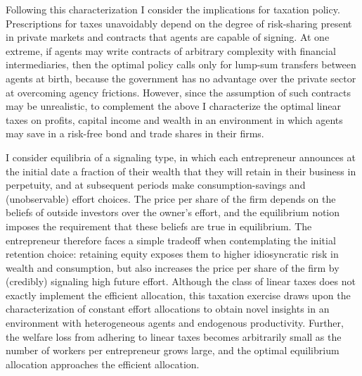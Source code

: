 \documentclass[11pt]{article}
\theoremstyle{plain}
\begin{document}
Following this characterization I consider the implications for taxation policy. Prescriptions for taxes unavoidably depend on the degree of risk-sharing present in private markets and contracts that agents are capable of signing. At one extreme, if agents may write contracts of arbitrary complexity with financial intermediaries, then the optimal policy calls only for lump-sum transfers between agents at birth, because the government has no advantage over the private sector at overcoming agency frictions. However, since the assumption of such contracts may be unrealistic, to complement the above I characterize the optimal linear taxes on profits, capital income and wealth in an environment in which agents may save in a risk-free bond and trade shares in their firms. 


I consider equilibria of a signaling type, in which each entrepreneur announces at the initial date a fraction of their wealth that they will retain in their business in perpetuity, and at subsequent periods make consumption-savings and (unobservable) effort choices. The price per share of the firm depends on the beliefs of outside investors over the owner's effort, and the equilibrium notion imposes the requirement that these beliefs are true in equilibrium. The entrepreneur therefore faces a simple tradeoff when contemplating the initial retention choice: retaining equity exposes them to higher idiosyncratic risk in wealth and consumption, but also increases the price per share of the firm by (credibly) signaling high future effort. Although the class of linear taxes does not exactly implement the efficient allocation, this taxation exercise draws upon the characterization of constant effort allocations to obtain novel insights in an environment with heterogeneous agents and endogenous productivity. Further, the welfare loss from adhering to linear taxes becomes arbitrarily small as the number of workers per entrepreneur grows large, and the optimal equilibrium allocation approaches the efficient allocation. 
\end{document}
